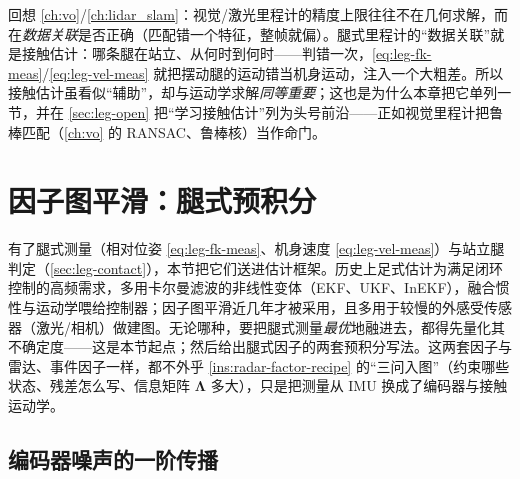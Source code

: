 \begin{insight}\label{ins:leg-contact-assoc}
回想 \cref{ch:vo}/\cref{ch:lidar_slam}：视觉/激光里程计的精度上限往往不在几何求解，而在\emph{数据关联}是否正确（匹配错一个特征，整帧就偏）。腿式里程计的“数据关联”就是接触估计：哪条腿在站立、从何时到何时——判错一次，\cref{eq:leg-fk-meas}/\cref{eq:leg-vel-meas} 就把摆动腿的运动错当机身运动，注入一个大粗差。所以接触估计虽看似“辅助”，却与运动学求解\emph{同等重要}；这也是为什么本章把它单列一节，并在 \cref{sec:leg-open} 把“学习接触估计”列为头号前沿——正如视觉里程计把鲁棒匹配（\cref{ch:vo} 的 RANSAC、鲁棒核）当作命门。
\end{insight}

\section{因子图平滑：腿式预积分}
\label{sec:leg-graph}

有了腿式测量（相对位姿 \cref{eq:leg-fk-meas}、机身速度 \cref{eq:leg-vel-meas}）与站立腿判定（\cref{sec:leg-contact}），本节把它们送进估计框架。历史上足式估计为满足闭环控制的高频需求，多用卡尔曼滤波的非线性变体（EKF\cite{bloesch2013state}、UKF、InEKF\cite{hartley2020contact}），融合惯性与运动学喂给控制器；因子图平滑近几年才被采用，且多用于较慢的外感受传感器（激光/相机）做建图\cite{hartley2018legged,wisth2023vilens}。无论哪种，要把腿式测量\emph{最优}地融进去，都得先量化其不确定度——这是本节起点；然后给出腿式因子的两套预积分写法。这两套因子与雷达、事件因子一样，都不外乎 \cref{ins:radar-factor-recipe} 的“三问入图”（约束哪些状态、残差怎么写、信息矩阵 $\boldsymbol\Lambda$ 多大），只是把测量从 IMU 换成了编码器与接触运动学。

\subsection{编码器噪声的一阶传播}
\label{subsec:leg-encoder-noise}

